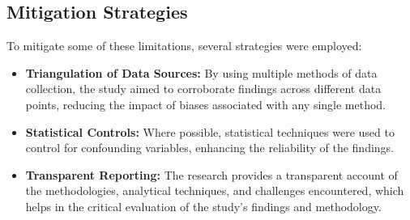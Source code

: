 \subsection{Mitigation Strategies}
To mitigate some of these limitations, several strategies were employed:
\begin{itemize}
    \item \textbf{Triangulation of Data Sources:} By using multiple methods of data collection, the study aimed to corroborate findings across different data points, reducing the impact of biases associated with any single method.
    \item \textbf{Statistical Controls:} Where possible, statistical techniques were used to control for confounding variables, enhancing the reliability of the findings.
    \item \textbf{Transparent Reporting:} The research provides a transparent account of the methodologies, analytical techniques, and challenges encountered, which helps in the critical evaluation of the study’s findings and methodology.
\end{itemize}

